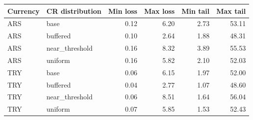 \begin{tabular}{llrrrr}
\toprule
Currency & CR distribution & Min loss & Max loss & Min tail & Max tail \\
\midrule
ARS & base & 0.12 & 6.20 & 2.73 & 53.11 \\
ARS & buffered & 0.10 & 2.64 & 1.88 & 48.31 \\
ARS & near\_threshold & 0.16 & 8.32 & 3.89 & 55.53 \\
ARS & uniform & 0.16 & 5.82 & 2.10 & 52.03 \\
TRY & base & 0.06 & 6.15 & 1.97 & 52.00 \\
TRY & buffered & 0.04 & 2.77 & 1.07 & 48.60 \\
TRY & near\_threshold & 0.06 & 8.51 & 1.64 & 56.04 \\
TRY & uniform & 0.07 & 5.85 & 1.53 & 52.43 \\
\bottomrule
\end{tabular}
